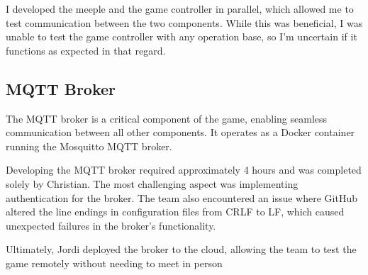 \documentclass[../main.tex]{subfiles}
\begin{document}
I developed the meeple and the game controller in parallel, which allowed me to test communication between the two components. While this was beneficial, I was unable to test the game controller with any operation base, so I’m uncertain if it functions as expected in that regard.

\subsection{MQTT Broker}

The MQTT broker is a critical component of the game, enabling seamless communication between all other components. It operates as a Docker container running the Mosquitto MQTT broker.

Developing the MQTT broker required approximately 4 hours and was completed solely by Christian. The most challenging aspect was implementing authentication for the broker. The team also encountered an issue where GitHub altered the line endings in configuration files from CRLF to LF, which caused unexpected failures in the broker's functionality.

Ultimately, Jordi deployed the broker to the cloud, allowing the team to test the game remotely without needing to meet in person
\end{document}

